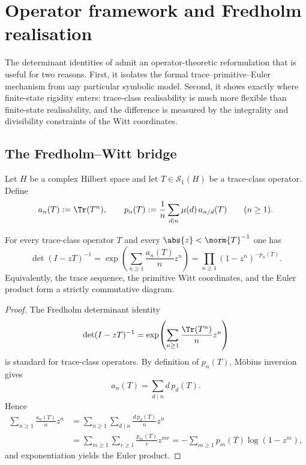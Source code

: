 ﻿\section{Operator framework and Fredholm realisation}
\label{sec:operator}

The determinant identities of
 admit
an operator-theoretic reformulation that is useful for two reasons.
First, it isolates the formal trace--primitive--Euler mechanism from
any particular symbolic model. Second, it shows exactly where
finite-state rigidity enters: trace-class realisability is much more
flexible than finite-state realisability, and the difference is
measured by the integrality and divisibility constraints of the Witt
coordinates.

\subsection{The Fredholm--Witt bridge}

Let $H$ be a complex Hilbert space and let $T\in\mathcal S_1(H)$ be a
trace-class operator. Define
\[
  a_n(T):=\Tr(T^n),
  \qquad
  p_n(T):=\frac{1}{n}\sum_{d\mid n}\mu(d)\,a_{n/d}(T)
  \qquad (n\ge 1).
\]

\begin{theorem}
  \label{thm:fredholm-witt-bridge}
  For every trace-class operator $T$ and every $\abs{z}<\norm{T}^{-1}$
  one has
  \[
    \det(I-zT)^{-1}
    =\exp\!\left(\sum_{n\ge 1}\frac{a_n(T)}{n}z^n\right)
    =\prod_{n\ge 1}(1-z^n)^{-p_n(T)}.
  \]
  Equivalently, the trace sequence, the primitive Witt coordinates,
  and the Euler product form a strictly commutative diagram.
\end{theorem}

\begin{proof}
  The Fredholm determinant identity
  \[
    \det(I-zT)^{-1}
    =\exp\!\left(\sum_{n\ge 1}\frac{\Tr(T^n)}{n}z^n\right)
  \]
  is standard for trace-class operators. By definition of $p_n(T)$,
  M\"obius inversion gives
  \[
    a_n(T)=\sum_{d\mid n} d\,p_d(T).
  \]
  Hence
  \begin{align*}
    \sum_{n\ge 1}\frac{a_n(T)}{n}z^n
    &=\sum_{n\ge 1}\sum_{d\mid n}\frac{d\,p_d(T)}{n}z^n \\
    &=\sum_{m\ge 1}\sum_{r\ge 1}\frac{p_m(T)}{r}z^{mr}
      =-\sum_{m\ge 1}p_m(T)\log(1-z^m),
  \end{align*}
  and exponentiation yields the Euler product.
\end{proof}

